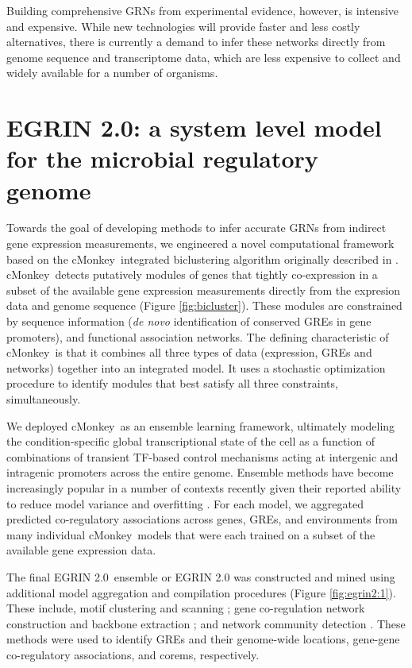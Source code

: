 \documentclass{article}
\newcommand{\tmsamp}[1]{\textsf{#1}}
\newcommand{\cm}{\tmsamp{cMonkey}}
\newcommand{\egrine}{{\tmsamp{EGRIN 2.0}}}
\begin{document}
Building comprehensive GRNs from experimental evidence, however, is intensive and expensive. While new technologies will provide faster and less costly alternatives, there is currently a demand to infer these networks directly from genome sequence and transcriptome data, which are less expensive to collect and widely available for a number of organisms. 

\section{\egrine: a system level model for the microbial regulatory genome} 

Towards the goal of developing methods to infer accurate GRNs from indirect gene expression measurements, we engineered a novel computational framework based on the \cm\ integrated biclustering algorithm originally described in \cite{reiss_integrated_2006}. \cm\ detects putatively modules of genes that tightly co-expression in a subset of the available gene expression measurements directly from the expresion data and genome sequence (Figure \ref{fig:bicluster}). These modules are constrained by sequence information (\textit{de novo} identification of conserved GREs in gene promoters), and functional association networks. The defining characteristic of \cm\ is that it combines all three types of data (expression, GREs and networks) together into an integrated model. It uses a stochastic optimization procedure to identify modules that best satisfy all three constraints, simultaneously.

We deployed \cm\ as an ensemble learning framework, ultimately modeling the condition-specific global transcriptional state of the cell as a function of combinations of transient TF-based control mechanisms acting at intergenic and intragenic promoters across the entire genome. Ensemble methods have become increasingly popular in a number of contexts recently given their reported ability to reduce model variance and overfitting \cite{seni_ensemble_2010}. For each model, we aggregated predicted co-regulatory associations across genes, GREs, and environments from many individual \cm\ models that were each trained on a subset of the available gene expression data. 

The final \egrine~ensemble or EGRIN 2.0 was constructed and mined using additional model aggregation and compilation procedures (Figure \ref{fig:egrin2:1}). These include, motif clustering \cite{van_dongen_using_2012} and scanning \cite{bailey_methods_1998}; gene co-regulation network construction and backbone extraction \cite{serrano_extracting_2009}; and network community detection \cite{ahn_link_2010}. These methods were used to identify GREs and their genome-wide locations, gene-gene co-regulatory associations, and corems, respectively.\\
\end{document}

